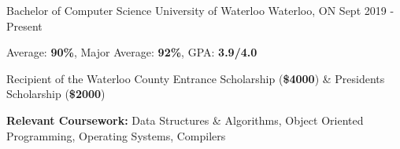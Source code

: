 
\begin{cventries}
  \cventry
    {Bachelor of Computer Science} %
    {University of Waterloo} %
    {Waterloo, ON} %
    {Sept 2019 - Present} %
    {
      \begin{cvitems} %
        \item{Average: \textbf{90\%}, Major Average: \textbf{92\%}, GPA: \textbf{3.9/4.0}}
        \item {Recipient of the Waterloo County Entrance Scholarship (\textbf{\$4000}) \& President\textquotesingle s Scholarship (\textbf{\$2000})}
        \item {\textbf{Relevant Coursework:} Data Structures \& Algorithms, Object Oriented Programming, Operating Systems, Compilers}
      \end{cvitems}
    }
\end{cventries}
